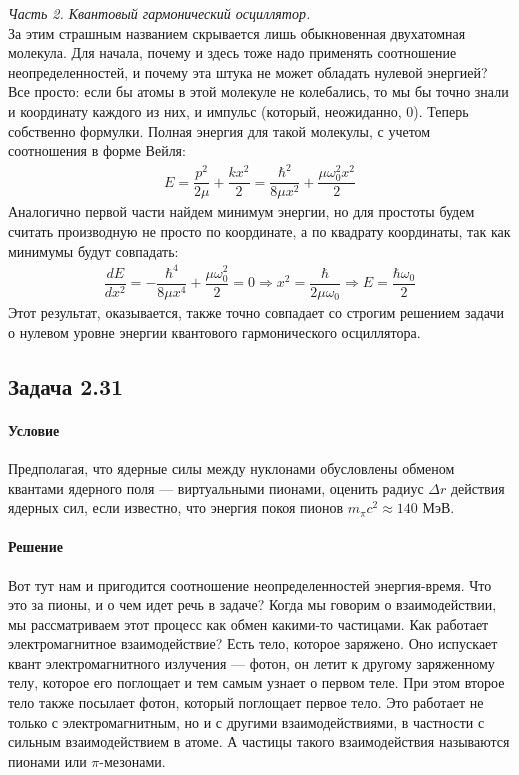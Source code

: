 \documentclass[12pt]{article}
\begin{document}
\vspace{6mm}
\textit{Часть 2. Квантовый гармонический осциллятор.}\vspace{1mm}\\
За этим страшным названием скрывается лишь обыкновенная двухатомная молекула. Для начала, почему и здесь тоже надо применять соотношение неопределенностей, и почему эта штука не может обладать нулевой энергией? Все просто: если бы атомы в этой молекуле не колебались, то мы бы точно знали и координату каждого из них, и импульс (который, неожиданно, 0). Теперь собственно формулки. Полная энергия для такой молекулы, с учетом соотношения в форме Вейля:
\begin{gather*}
     E = \dfrac{p^2}{2\mu} + \dfrac{kx^2}{2} = \dfrac{\hbar^2}{8\mu x^2} + \dfrac{\mu \omega_0^2 x^2}{2}
\end{gather*}
Аналогично первой части найдем минимум энергии, но для простоты будем считать производную не просто по координате, а по квадрату координаты, так как минимумы будут совпадать:
\begin{gather*}
    \dfrac{dE}{dx^2} = -\dfrac{\hbar^4}{8\mu x^4} + \dfrac{\mu \omega_0^2}{2} = 0 \Rightarrow x^2 = \dfrac{\hbar}{2\mu\omega_0} \Rightarrow E = \dfrac{\hbar\omega_0}{2}
\end{gather*}
Этот результат, оказывается, также точно совпадает со строгим решением задачи о нулевом уровне энергии квантового гармонического осциллятора.

\subsection{Задача 2.31}
\label{task_2.31}
\paragraph{Условие}
Предполагая, что ядерные силы между нуклонами обусловлены обменом квантами ядерного поля --- виртуальными пионами, оценить радиус $\Delta r$ действия ядерных сил, если известно, что энергия покоя пионов $m_{\pi}c^2 \approx 140$ МэВ.
\paragraph{Решение}
Вот тут нам и пригодится соотношение неопределенностей энергия-время. Что это за пионы, и о чем идет речь в задаче? Когда мы говорим о взаимодействии, мы рассматриваем этот процесс как обмен какими-то частицами. Как работает электромагнитное взаимодействие? Есть тело, которое заряжено. Оно испускает квант электромагнитного излучения --- фотон, он летит к другому заряженному телу, которое его поглощает и тем самым узнает о первом теле. При этом второе тело также посылает фотон, который поглощает первое тело. Это работает не только с электромагнитным, но и с другими взаимодействиями, в частности с сильным взаимодействием в атоме. А частицы такого взаимодействия называются пионами или $\pi$-мезонами.
\end{document}
